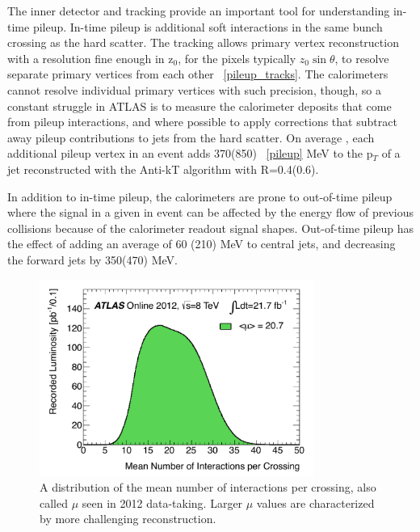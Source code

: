 The inner detector and tracking provide an important tool for understanding in-time pileup.  In-time pileup 
is additional soft interactions in the same bunch crossing as the hard scatter.  The tracking allows primary vertex reconstruction 
with a resolution fine enough in z$_0$, for the pixels typically $z_0\sin\theta$, 
to resolve separate primary vertices from each other ~\ref{pileup_tracks}.   The calorimeters cannot resolve individual primary vertices with such precision, 
though, so a constant struggle in ATLAS is to measure the calorimeter deposits that come from pileup interactions, 
and where possible to apply corrections that subtract away pileup contributions to jets from the hard scatter.  On average
, each additional pileup vertex in an event adds 370(850) ~\ref{pileup} MeV to the p$_T$ of a jet reconstructed with the Anti-kT algorithm with R=0.4(0.6).

In addition to in-time pileup, the calorimeters are prone to out-of-time pileup where 
the signal in a given in event can be affected by the energy flow of previous collisions because of the 
calorimeter readout signal shapes.  Out-of-time pileup has the effect of adding an average of 60
(210) MeV to central jets, and decreasing the forward jets by 350(470) MeV.  


\begin{figure}
	\includegraphics[width=0.8\textwidth]{ReconstructionPerformance/images/mu_2012-dec.pdf}
	\caption{A distribution of the mean number of interactions per crossing, also called $\mu$ seen in 2012 data-taking.  Larger $\mu$ values are characterized by more challenging reconstruction. 	\label{fig:mu_2012}  }
\end{figure}

